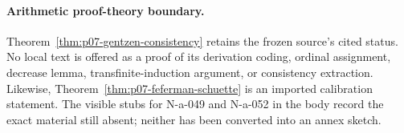 
\paragraph{Arithmetic proof-theory boundary.}
Theorem~\ref{thm:p07-gentzen-consistency} retains the frozen source's cited
status.  No local text is offered as a proof of its derivation coding,
ordinal assignment, decrease lemma, transfinite-induction argument, or
consistency extraction.  Likewise,
Theorem~\ref{thm:p07-feferman-schuette} is an imported calibration statement.
The visible stubs for N-a-049 and N-a-052 in the body record the exact
material still absent; neither has been converted into an annex sketch.
